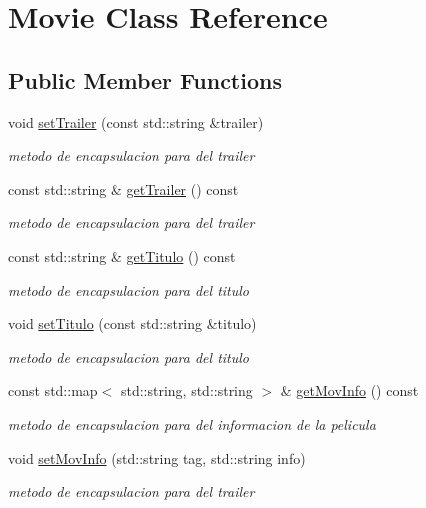 \hypertarget{classMovie}{}\section{Movie Class Reference}
\label{classMovie}
\subsection*{Public Member Functions}
\begin{DoxyCompactItemize}
\item 
void \hyperlink{classMovie_a418a7d966ed0dadaf3d9725b3693091d}{set\+Trailer} (const std\+::string \&trailer)
\begin{DoxyCompactList}\small\item\em metodo de encapsulacion para del trailer \end{DoxyCompactList}\item 
\mbox{\label{classMovie_a7c37c18bac31b11338bbf4f6ebe2e9d9}} 
const std\+::string \& \hyperlink{classMovie_a7c37c18bac31b11338bbf4f6ebe2e9d9}{get\+Trailer} () const
\begin{DoxyCompactList}\small\item\em metodo de encapsulacion para del trailer \end{DoxyCompactList}\item 
\mbox{\label{classMovie_a3046663104438390bfee7003ab994e3b}} 
const std\+::string \& \hyperlink{classMovie_a3046663104438390bfee7003ab994e3b}{get\+Titulo} () const
\begin{DoxyCompactList}\small\item\em metodo de encapsulacion para del titulo \end{DoxyCompactList}\item 
void \hyperlink{classMovie_a36d6116d5f693e5a8079f99ac2cea6be}{set\+Titulo} (const std\+::string \&titulo)
\begin{DoxyCompactList}\small\item\em metodo de encapsulacion para del titulo \end{DoxyCompactList}\item 
\mbox{\label{classMovie_a6cb0b6fcb38e2ec4c37c8599c1b46123}} 
const std\+::map$<$ std\+::string, std\+::string $>$ \& \hyperlink{classMovie_a6cb0b6fcb38e2ec4c37c8599c1b46123}{get\+Mov\+Info} () const
\begin{DoxyCompactList}\small\item\em metodo de encapsulacion para del informacion de la pelicula \end{DoxyCompactList}\item 
void \hyperlink{classMovie_a3e136a871d3272a96c057ed7fbe21d85}{set\+Mov\+Info} (std\+::string tag, std\+::string info)
\begin{DoxyCompactList}\small\item\em metodo de encapsulacion para del trailer \end{DoxyCompactList}\end{DoxyCompactItemize}


